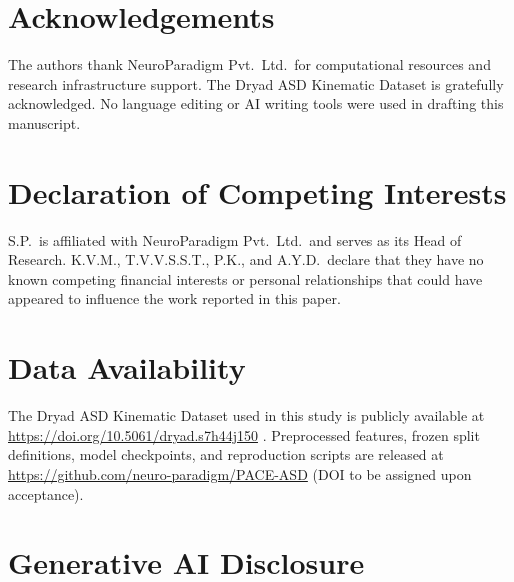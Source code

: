 \documentclass[a4paper,fleqn]{cas-sc}
\begin{document}
\section*{Acknowledgements}

The authors thank NeuroParadigm Pvt.\ Ltd.\ for computational resources and
research infrastructure support.
The Dryad ASD Kinematic Dataset is gratefully acknowledged.
No language editing or AI writing tools were used in drafting this manuscript.

\printcredits

\section*{Declaration of Competing Interests}

S.P.\ is affiliated with NeuroParadigm Pvt.\ Ltd.\ and serves as its Head of
Research.
K.V.M., T.V.V.S.S.T., P.K., and A.Y.D.\ declare that they have no known
competing financial interests or personal relationships that could have appeared
to influence the work reported in this paper.

\section*{Data Availability}

The Dryad ASD Kinematic Dataset used in this study is publicly available at
\url{https://doi.org/10.5061/dryad.s7h44j150} \citep{aljubouri2020}.
Preprocessed features, frozen split definitions, model checkpoints, and
reproduction scripts are released at
\url{https://github.com/neuro-paradigm/PACE-ASD}
(DOI to be assigned upon acceptance).

\section*{Generative AI Disclosure}
\end{document}
